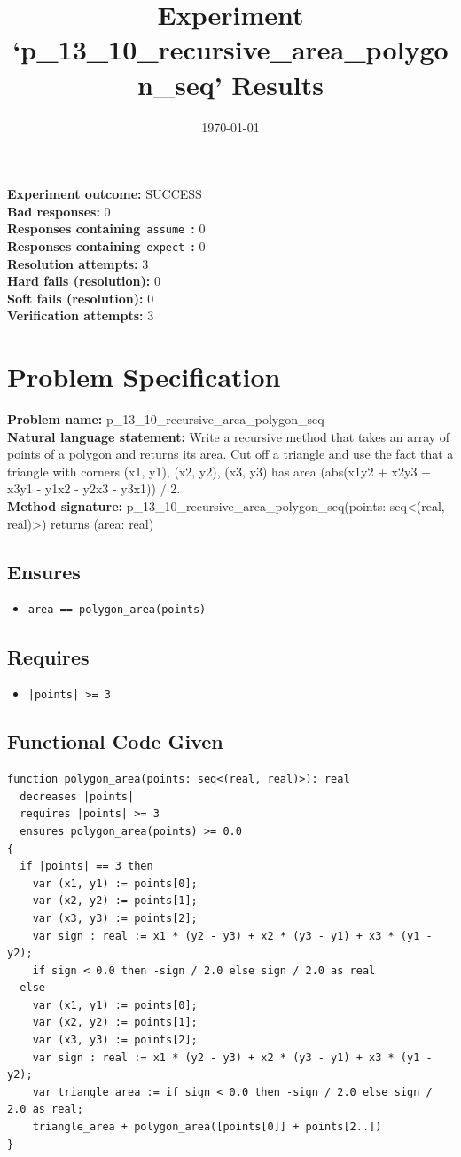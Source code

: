 \documentclass{article}
\begin{document}
\title{Experiment `p\_13\_10\_recursive\_area\_polygon\_seq' Results}
\author{\today}
\date{}
\maketitle
\textbf{Experiment outcome: }SUCCESS
\\\textbf{Bad responses: }0
\\\textbf{Responses containing}~\texttt{assume}~\textbf{: }0
\\\textbf{Responses containing}~\texttt{expect}~\textbf{: }0
\\\textbf{Resolution attempts: }3
\\\textbf{Hard fails (resolution): }0
\\\textbf{Soft fails (resolution): }0
\\\textbf{Verification attempts: }3
\section*{Problem Specification}
\textbf{Problem name: }p\_13\_10\_recursive\_area\_polygon\_seq
\\\textbf{Natural language statement: }Write a recursive method that takes an array of points of a polygon and returns its area. Cut off a triangle and use the fact that a triangle with corners (x1, y1), (x2, y2), (x3, y3) has area (abs(x1y2 + x2y3 + x3y1 - y1x2 - y2x3 - y3x1)) / 2.
\\\textbf{Method signature: }p\_13\_10\_recursive\_area\_polygon\_seq(points: seq<(real, real)>) returns (area: real)
\subsection*{Ensures}
\begin{itemize}
\item \texttt{area == polygon\_area(points)}
\end{itemize}
\subsection*{Requires}
\begin{itemize}
\item \texttt{|points| >= 3}
\end{itemize}
\subsection*{Functional Code Given}
\begin{lstlisting}
function polygon_area(points: seq<(real, real)>): real
  decreases |points|
  requires |points| >= 3
  ensures polygon_area(points) >= 0.0
{
  if |points| == 3 then 
    var (x1, y1) := points[0];
    var (x2, y2) := points[1];
    var (x3, y3) := points[2];
    var sign : real := x1 * (y2 - y3) + x2 * (y3 - y1) + x3 * (y1 - y2);
    if sign < 0.0 then -sign / 2.0 else sign / 2.0 as real 
  else 
    var (x1, y1) := points[0];
    var (x2, y2) := points[1];
    var (x3, y3) := points[2];
    var sign : real := x1 * (y2 - y3) + x2 * (y3 - y1) + x3 * (y1 - y2);
    var triangle_area := if sign < 0.0 then -sign / 2.0 else sign / 2.0 as real;
    triangle_area + polygon_area([points[0]] + points[2..])
}
\end{lstlisting}
\clearpage
\end{document}
